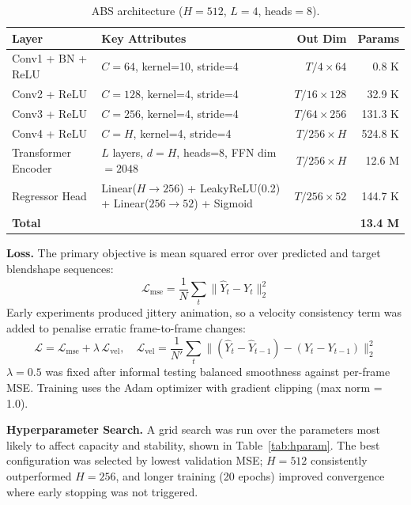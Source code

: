 \begin{table}[h]
\centering
\caption{ABS architecture ($H{=}512$, $L{=}4$, heads$={8}$).}
\label{tab:abs_arch}
\small
\begin{tabular}{p{2.8cm}p{5.2cm}rr}
\hline
\textbf{Layer} & \textbf{Key Attributes} & \textbf{Out Dim} & \textbf{Params} \\
\hline
Conv1 + BN + ReLU   & $C{=}64$, kernel=10, stride=4    & $T/4 \times 64$      & 0.8 K   \\
Conv2 + ReLU        & $C{=}128$, kernel=4, stride=4    & $T/16 \times 128$    & 32.9 K  \\
Conv3 + ReLU        & $C{=}256$, kernel=4, stride=4    & $T/64 \times 256$    & 131.3 K \\
Conv4 + ReLU        & $C{=}H$, kernel=4, stride=4      & $T/256 \times H$     & 524.8 K \\
Transformer Encoder & $L$ layers, $d{=}H$, heads=8, FFN dim$=2048$ & $T/256 \times H$ & 12.6 M \\
Regressor Head      & Linear($H{\to}256$) + LeakyReLU(0.2) + Linear($256{\to}52$) + Sigmoid & $T/256 \times 52$ & 144.7 K \\
\hline
\textbf{Total}      &                                  &                      & \textbf{13.4 M} \\
\hline
\end{tabular}
\end{table}

\noindent\textbf{Loss.} The primary objective is mean squared error over predicted and target blendshape sequences:
$$\mathcal{L}_{\text{mse}} = \frac{1}{N}\sum_{t} \lVert \hat{Y}_t - Y_t \rVert_2^2$$
Early experiments produced jittery animation, so a velocity consistency term was added to penalise erratic frame-to-frame changes:
$$\mathcal{L} = \mathcal{L}_{\text{mse}} + \lambda\,\mathcal{L}_{\text{vel}}, \quad \mathcal{L}_{\text{vel}} = \frac{1}{N'}\sum_{t} \lVert (\hat{Y}_t{-}\hat{Y}_{t-1}) - (Y_t{-}Y_{t-1}) \rVert_2^2$$
$\lambda{=}0.5$ was fixed after informal testing balanced smoothness against per-frame MSE. Training uses the Adam optimizer with gradient clipping (max norm = 1.0).

\noindent\textbf{Hyperparameter Search.} A grid search was run over the parameters most likely to affect capacity and stability, shown in Table~\ref{tab:hparam}. The best configuration was selected by lowest validation MSE; $H{=}512$ consistently outperformed $H{=}256$, and longer training (20 epochs) improved convergence where early stopping was not triggered.

